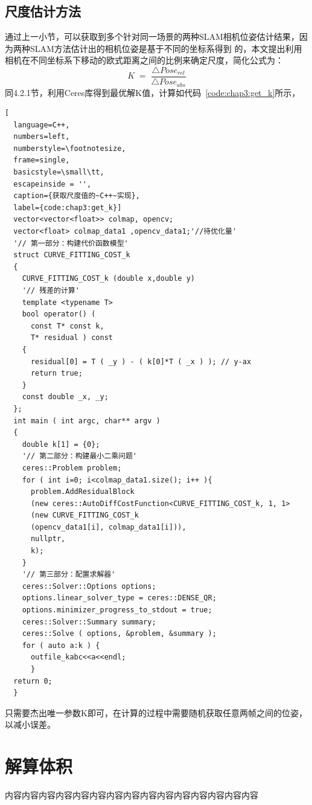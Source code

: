 \subsection{尺度估计方法}
通过上一小节，可以获取到多个针对同一场景的两种SLAM相机位姿估计结果，因为两种SLAM方法估计出的相机位姿是基于不同的坐标系得到
的，本文提出利用相机在不同坐标系下移动的欧式距离之间的比例来确定尺度，简化公式为：
\begin{equation}K\;=\;\frac{\triangle Pose_{rel}}{\triangle Pose_{abs}}  
\label{equ:getVolume_K}\end{equation}
同4.2.1节，利用Ceres库得到最优解K值，计算如代码~\ref{code:chap3:get_k}所示，
\begin{lstlisting}[
  language=C++,
  numbers=left,                
  numberstyle=\footnotesize,
  frame=single,     
  basicstyle=\small\tt,    
  escapeinside = '',
  caption={获取尺度值的~C++~实现},
  label={code:chap3:get_k}]
  vector<vector<float>> colmap, opencv;
  vector<float> colmap_data1 ,opencv_data1;'//待优化量'
  '// 第一部分：构建代价函数模型'
  struct CURVE_FITTING_COST_k
  {
    CURVE_FITTING_COST_k (double x,double y)
    '// 残差的计算'
    template <typename T>
    bool operator() (
      const T* const k,     
      T* residual ) const     
    {
      residual[0] = T ( _y ) - ( k[0]*T ( _x ) ); // y-ax
      return true;
    }
    const double _x, _y;
  };
  int main ( int argc, char** argv )
  {   
    double k[1] = {0};
    '// 第二部分：构建最小二乘问题'
    ceres::Problem problem;
    for ( int i=0; i<colmap_data1.size(); i++ ){
      problem.AddResidualBlock 
      (new ceres::AutoDiffCostFunction<CURVE_FITTING_COST_k, 1, 1>
      (new CURVE_FITTING_COST_k 
      (opencv_data1[i], colmap_data1[i])),
      nullptr,
      k);
    }
    '// 第三部分：配置求解器'
    ceres::Solver::Options options;   
    options.linear_solver_type = ceres::DENSE_QR;  
    options.minimizer_progress_to_stdout = true;  
    ceres::Solver::Summary summary;              
    ceres::Solve ( options, &problem, &summary );  
    for ( auto a:k ) {
      outfile_kabc<<a<<endl;
      }
  return 0;
  }
\end{lstlisting}
只需要杰出唯一参数K即可，在计算的过程中需要随机获取任意两帧之间的位姿，以减小误差。
\section{解算体积}
\label{sec:4.4}
内容内容内容内容内容内容内容内容内容内容内容内容内容内容内容

